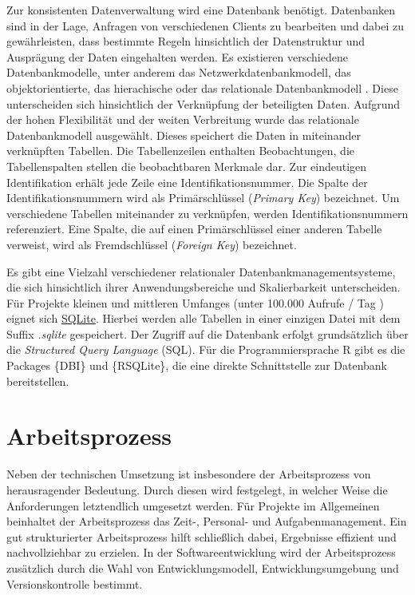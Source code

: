 \documentclass[
]{article}
\begin{document}
Zur konsistenten Datenverwaltung wird eine Datenbank benötigt. Datenbanken sind in der Lage, Anfragen von verschiedenen Clients zu bearbeiten und dabei zu gewährleisten, dass bestimmte Regeln hinsichtlich der Datenstruktur und Ausprägung der Daten eingehalten werden. Es existieren verschiedene Datenbankmodelle, unter anderem das Netzwerkdatenbankmodell, das objektorientierte, das hierachische oder das relationale Datenbankmodell \autocite{laudon2015}. Diese unterscheiden sich hinsichtlich der Verknüpfung der beteiligten Daten. Aufgrund der hohen Flexibilität und der weiten Verbreitung wurde das relationale Datenbankmodell ausgewählt. Dieses speichert die Daten in miteinander verknüpften Tabellen. Die Tabellenzeilen enthalten Beobachtungen, die Tabellenspalten stellen die beobachtbaren Merkmale dar. Zur eindeutigen Identifikation erhält jede Zeile eine Identifikationsnummer. Die Spalte der Identifikationsnummern wird als Primärschlüssel (\emph{Primary Key}) bezeichnet. Um verschiedene Tabellen miteinander zu verknüpfen, werden Identifikationsnummern referenziert. Eine Spalte, die auf einen Primärschlüssel einer anderen Tabelle verweist, wird als Fremdschlüssel (\emph{Foreign Key}) bezeichnet.

Es gibt eine Vielzahl verschiedener relationaler Datenbankmanagementsysteme, die sich hinsichtlich ihrer Anwendungsbereiche und Skalierbarkeit unterscheiden. Für Projekte kleinen und mittleren Umfanges (unter 100.000 Aufrufe / Tag \autocite{whysqlite}) eignet sich \href{https://www.sqlite.org/index.html}{SQLite}. Hierbei werden alle Tabellen in einer einzigen Datei mit dem Suffix \emph{.sqlite} gespeichert. Der Zugriff auf die Datenbank erfolgt grundsätzlich über die \emph{Structured Query Language} (SQL). Für die Programmiersprache R gibt es die Packages \{DBI\} und \{RSQLite\}, die eine direkte Schnittstelle zur Datenbank bereitstellen.

\hypertarget{workflow}{%
\section{Arbeitsprozess}\label{workflow}}

Neben der technischen Umsetzung ist insbesondere der Arbeitsprozess von herausragender Bedeutung. Durch diesen wird festgelegt, in welcher Weise die Anforderungen letztendlich umgesetzt werden. Für Projekte im Allgemeinen beinhaltet der Arbeitsprozess das Zeit-, Personal- und Aufgabenmanagement. Ein gut strukturierter Arbeitsprozess hilft schließlich dabei, Ergebnisse effizient und nachvollziehbar zu erzielen. In der Softwareentwicklung wird der Arbeitsprozess zusätzlich durch die Wahl von Entwicklungsmodell, Entwicklungsumgebung und Versionskontrolle bestimmt.
\end{document}
